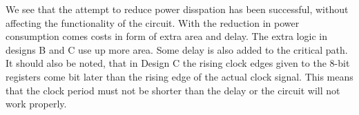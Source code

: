 \documentclass[11pt,a4paper]{article}
\begin{document}
We see that the attempt to reduce power disspation has been successful, without affecting the functionality of the circuit. With the reduction in power consumption comes costs in form of extra area and delay. The extra logic in designs B and C use up more area. Some delay is also added to the critical path. It should also be noted, that in Design C the rising clock edges given to the 8-bit registers come bit later than the rising edge of the actual clock signal. This means that the clock period must not be shorter than the delay or the circuit will not work properly.




\end{document}
